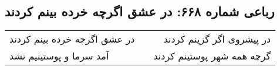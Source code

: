 \begin{center}
\section*{رباعی شماره ۶۶۸: در عشق اگرچه خرده بینم کردند}
\label{sec:0668}
\begin{longtable}{l p{0.5cm} r}
در عشق اگرچه خرده بینم کردند
&&
در پیشروی اگر گزینم کردند
\\
آمد سرما و پوستینیم نشد
&&
گرچه همه شهر پوستینم کردند
\\
\end{longtable}
\end{center}
